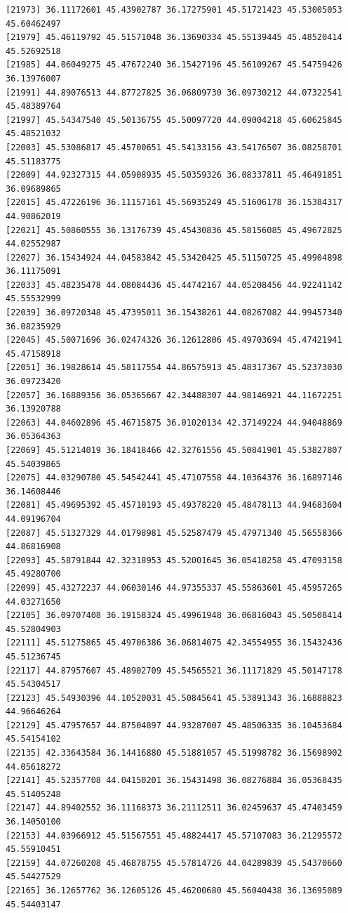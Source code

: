 \documentclass[
  letterpaper,
  DIV=11,
  numbers=noendperiod]{scrartcl}
\begin{document}
\begin{verbatim}
[21973] 36.11172601 45.43902787 36.17275901 45.51721423 45.53005053 45.60462497
[21979] 45.46119792 45.51571048 36.13690334 45.55139445 45.48520414 45.52692518
[21985] 44.06049275 45.47672240 36.15427196 45.56109267 45.54759426 36.13976007
[21991] 44.89076513 44.87727825 36.06809730 36.09730212 44.07322541 45.48389764
[21997] 45.54347540 45.50136755 45.50097720 44.09004218 45.60625845 45.48521032
[22003] 45.53086817 45.45700651 45.54133156 43.54176507 36.08258701 45.51183775
[22009] 44.92327315 44.05908935 45.50359326 36.08337811 45.46491851 36.09689865
[22015] 45.47226196 36.11157161 45.56935249 45.51606178 36.15384317 44.90862019
[22021] 45.50860555 36.13176739 45.45430836 45.58156085 45.49672825 44.02552987
[22027] 36.15434924 44.04583842 45.53420425 45.51150725 45.49904898 36.11175091
[22033] 45.48235478 44.08084436 45.44742167 44.05208456 44.92241142 45.55532999
[22039] 36.09720348 45.47395011 36.15438261 44.08267082 44.99457340 36.08235929
[22045] 45.50071696 36.02474326 36.12612806 45.49703694 45.47421941 45.47158918
[22051] 36.19828614 45.58117554 44.86575913 45.48317367 45.52373030 36.09723420
[22057] 36.16889356 36.05365667 42.34488307 44.98146921 44.11672251 36.13920788
[22063] 44.04602896 45.46715875 36.01020134 42.37149224 44.94048869 36.05364363
[22069] 45.51214019 36.18418466 42.32761556 45.50841901 45.53827807 45.54039865
[22075] 44.03290780 45.54542441 45.47107558 44.10364376 36.16897146 36.14608446
[22081] 45.49695392 45.45710193 45.49378220 45.48478113 44.94683604 44.09196704
[22087] 45.51327329 44.01798981 45.52587479 45.47971340 45.56558366 44.86816908
[22093] 45.58791844 42.32318953 45.52001645 36.05418258 45.47093158 45.49280700
[22099] 45.43272237 44.06030146 44.97355337 45.55863601 45.45957265 44.03271650
[22105] 36.09707408 36.19158324 45.49961948 36.06816043 45.50508414 45.52804903
[22111] 45.51275865 45.49706386 36.06814075 42.34554955 36.15432436 45.51236745
[22117] 44.87957607 45.48902709 45.54565521 36.11171829 45.50147178 45.54304517
[22123] 45.54930396 44.10520031 45.50845641 45.53891343 36.16888823 44.96646264
[22129] 45.47957657 44.87504897 44.93287007 45.48506335 36.10453684 45.54154102
[22135] 42.33643584 36.14416880 45.51881057 45.51998782 36.15698902 44.05618272
[22141] 45.52357708 44.04150201 36.15431498 36.08276884 36.05368435 45.51405248
[22147] 44.89402552 36.11168373 36.21112511 36.02459637 45.47403459 36.14050100
[22153] 44.03966912 45.51567551 45.48824417 45.57107083 36.21295572 45.55910451
[22159] 44.07260208 45.46878755 45.57814726 44.04289839 45.54370660 45.54427529
[22165] 36.12657762 36.12605126 45.46200680 45.56040438 36.13695089 45.54403147

\end{verbatim}
\end{document}
